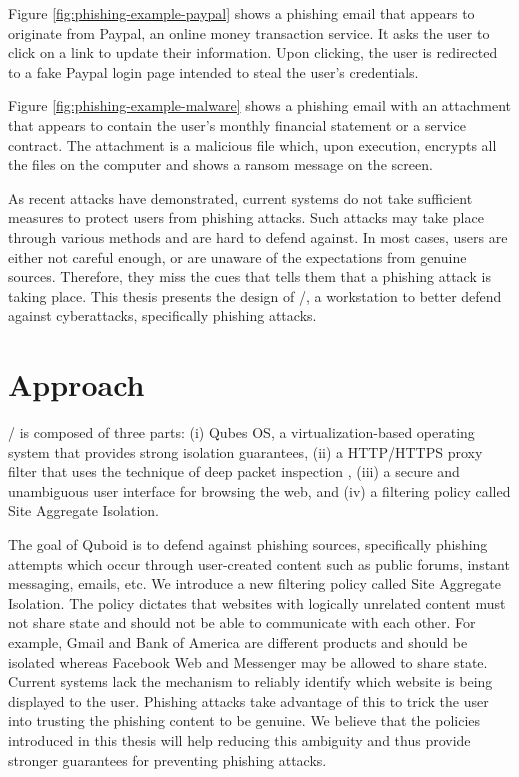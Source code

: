 Figure \ref{fig:phishing-example-paypal} shows a phishing email \cite{phishing-example-paypal} that appears to originate from Paypal, an online money transaction service. It asks the user to click on a link to update their information. Upon clicking, the user is redirected to a fake Paypal login page intended to steal the user's credentials.

Figure \ref{fig:phishing-example-malware} shows a phishing email \cite{phishing-example-malware} with an attachment that appears to contain the user's monthly financial statement or a service contract. The attachment is a malicious file which, upon execution, encrypts all the files on the computer and shows a ransom message on the screen.

As recent attacks have demonstrated, current systems do not take sufficient measures to protect users from phishing attacks. Such attacks may take place through various methods and are hard to defend against. In most cases, users are either not careful enough, or are unaware of the expectations from genuine sources. Therefore, they miss the cues that tells them that a phishing attack is taking place. This thesis presents the design of \namesecureworkstation/, a workstation to better defend against cyberattacks, specifically phishing attacks.

\section{Approach}

\namesecureworkstation/ is composed of three parts: (i) Qubes OS, a virtualization-based operating system that provides strong isolation guarantees, (ii) a HTTP/HTTPS proxy filter that uses the technique of deep packet inspection \cite{deep-packet-inspection}, (iii) a secure and unambiguous user interface for browsing the web, and (iv) a filtering policy called Site Aggregate Isolation.

The goal of Quboid is to defend against phishing sources, specifically phishing attempts which occur through user-created content such as public forums, instant messaging, emails, etc. We introduce a new filtering policy called Site Aggregate Isolation. The policy dictates that websites with logically unrelated content must not share state and should not be able to communicate with each other. For example, Gmail and Bank of America are different products and should be isolated whereas Facebook Web and Messenger may be allowed to share state. Current systems lack the mechanism to reliably identify which website is being displayed to the user. Phishing attacks take advantage of this to trick the user into trusting the phishing content to be genuine. We believe that the policies introduced in this thesis will help reducing this ambiguity and thus provide stronger guarantees for preventing phishing attacks.

